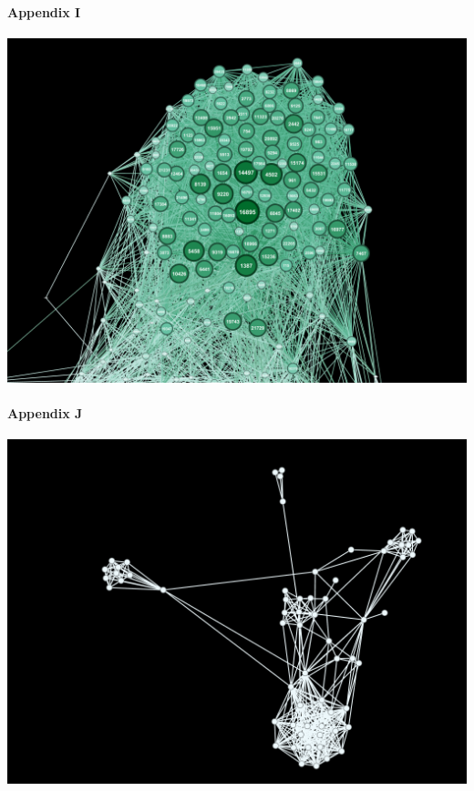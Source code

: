 \documentclass[11pt,twocolumn]{article}
\begin{document}
\paragraph{Appendix I\newline\newline\newline\newline\newline}
\includegraphics[scale=0.22]{eigenvectorcentraility_gov.png}
\paragraph{{\newline}Appendix J\newline\newline\newline\newline\newline}
\includegraphics[scale=0.22]{eigenvectorcentraility_pol.png}
\end{document}
